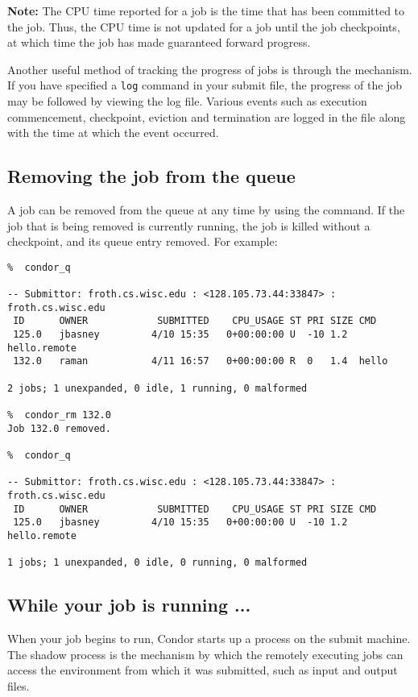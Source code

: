 \textbf{Note:} The CPU time reported for a job is the time that has been
committed to the job.  Thus, the CPU time is not updated for a job until
the job checkpoints, at which time the job has made guaranteed forward 
progress.

Another useful method of tracking the progress of jobs is through the
 mechanism.  If you have specified a \texttt{log} command in 
your submit file, the progress of the job may be followed by viewing the
log file.  Various events such as execution commencement, checkpoint, eviction 
and termination are logged in the file along with the time at which the event 
occurred.

\subsection{Removing the job from the queue}
A job can be removed from the queue at any time by using the 
command.  If the job that is being removed is currently running, the job
is killed without a checkpoint, and its queue entry removed.  For example:
\begin{verbatim}
%  condor_q

-- Submittor: froth.cs.wisc.edu : <128.105.73.44:33847> : froth.cs.wisc.edu
 ID      OWNER            SUBMITTED    CPU_USAGE ST PRI SIZE CMD               
 125.0   jbasney         4/10 15:35   0+00:00:00 U  -10 1.2  hello.remote      
 132.0   raman           4/11 16:57   0+00:00:00 R  0   1.4  hello             

2 jobs; 1 unexpanded, 0 idle, 1 running, 0 malformed

%  condor_rm 132.0
Job 132.0 removed.

%  condor_q

-- Submittor: froth.cs.wisc.edu : <128.105.73.44:33847> : froth.cs.wisc.edu
 ID      OWNER            SUBMITTED    CPU_USAGE ST PRI SIZE CMD               
 125.0   jbasney         4/10 15:35   0+00:00:00 U  -10 1.2  hello.remote      

1 jobs; 1 unexpanded, 0 idle, 0 running, 0 malformed
\end{verbatim}

\subsection{While your job is running ...}
When your job begins to run, Condor starts up a  process
on the submit machine.  The shadow process is the mechanism by which the
remotely executing jobs can access the environment from which it was
submitted, such as input and output files.  

